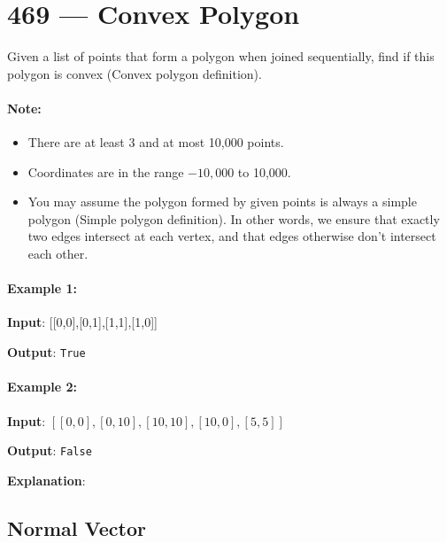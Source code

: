 \section{469 --- Convex Polygon}
Given a list of points that form a polygon when joined sequentially, find if this polygon is convex (Convex polygon definition).


\paragraph{Note:}

\begin{itemize}
\item There are at least 3 and at most 10,000 points.
\item Coordinates are in the range $-10,000$ to 10,000.
\item You may assume the polygon formed by given points is always a simple polygon (Simple polygon definition). In other words, we ensure that exactly two edges intersect at each vertex, and that edges otherwise don't intersect each other.

\end{itemize}

\paragraph{Example 1:}

\begin{flushleft}
\textbf{Input}: [[0,0],[0,1],[1,1],[1,0]]

\begin{figure}[H]
\end{figure}


\textbf{Output}: \texttt{True}
\end{flushleft}


\paragraph{Example 2:}

\textbf{Input}: $[[0,0],[0,10],[10,10],[10,0],[5,5]]$

\textbf{Output}: \texttt{False}

\textbf{Explanation}:

\begin{figure}[H]
\end{figure}

\subsection{Normal Vector}




